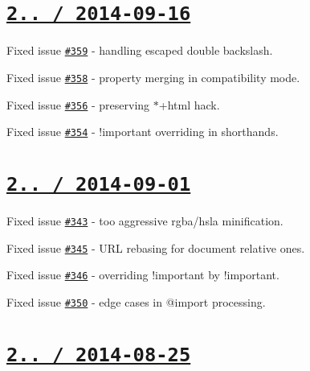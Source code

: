 \section*{\href{https://github.com/jakubpawlowicz/clean-css/compare/v2.2.15...v2.2.16}{\tt 2.. / 2014-\/09-\/16} }


\begin{DoxyItemize}
\item Fixed issue \href{https://github.com/jakubpawlowicz/clean-css/issues/359}{\tt \#359} -\/ handling escaped double backslash.
\item Fixed issue \href{https://github.com/jakubpawlowicz/clean-css/issues/358}{\tt \#358} -\/ property merging in compatibility mode.
\item Fixed issue \href{https://github.com/jakubpawlowicz/clean-css/issues/356}{\tt \#356} -\/ preserving {\ttfamily $\ast$+html} hack.
\item Fixed issue \href{https://github.com/jakubpawlowicz/clean-css/issues/354}{\tt \#354} -\/ {\ttfamily !important} overriding in shorthands.
\end{DoxyItemize}

\section*{\href{https://github.com/jakubpawlowicz/clean-css/compare/v2.2.14...v2.2.15}{\tt 2.. / 2014-\/09-\/01} }


\begin{DoxyItemize}
\item Fixed issue \href{https://github.com/jakubpawlowicz/clean-css/issues/343}{\tt \#343} -\/ too aggressive {\ttfamily rgba}/{\ttfamily hsla} minification.
\item Fixed issue \href{https://github.com/jakubpawlowicz/clean-css/issues/345}{\tt \#345} -\/ U\+RL rebasing for document relative ones.
\item Fixed issue \href{https://github.com/jakubpawlowicz/clean-css/issues/346}{\tt \#346} -\/ overriding {\ttfamily !important} by {\ttfamily !important}.
\item Fixed issue \href{https://github.com/jakubpawlowicz/clean-css/issues/350}{\tt \#350} -\/ edge cases in {\ttfamily @import} processing.
\end{DoxyItemize}

\section*{\href{https://github.com/jakubpawlowicz/clean-css/compare/v2.2.13...v2.2.14}{\tt 2.. / 2014-\/08-\/25} }



